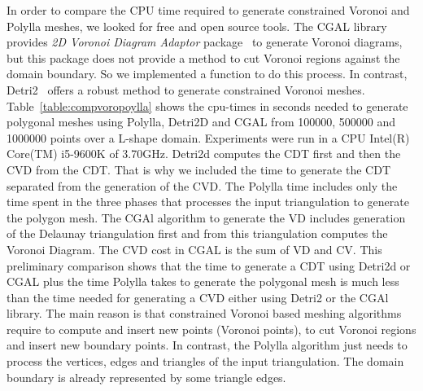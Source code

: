 \documentclass[lineno,pdflatex,sn-mathphys]{sn-jnl}%
\theoremstyle{thmstyleone}%
\theoremstyle{thmstyletwo}%
\theoremstyle{thmstylethree}%
\begin{document}
In order to compare the CPU time required to generate constrained Voronoi and Polylla meshes,  we looked for free and open source tools. The CGAL library provides  {\em  2D Voronoi Diagram Adaptor} package~\cite{cgal:k-vda2-21b} to generate Voronoi diagrams, but this package does not provide a method to cut Voronoi regions against the domain boundary. So we  implemented  a function to do this process. In contrast, Detri2~\cite{Detri2} offers a robust method to generate constrained Voronoi meshes.   Table~\ref{table:compvoropoylla} shows the cpu-times in seconds needed to generate polygonal meshes using Polylla, Detri2D and CGAL from 100000, 500000 and 1000000 points over a L-shape domain. Experiments were run in a CPU Intel(R) Core(TM) i5-9600K of 3.70GHz. Detri2d computes the CDT first and then the CVD from the CDT. That is why we included the time to generate the CDT separated from the generation of the CVD. 
The Polylla time includes only the time spent in  the three phases that processes the input triangulation to generate the polygon mesh. The CGAl algorithm to generate the VD includes generation of the Delaunay triangulation first and from this triangulation computes the Voronoi Diagram. The CVD cost in CGAL is the sum of VD and CV. This preliminary comparison shows that the time to generate a CDT using Detri2d or CGAL plus the time Polylla takes to generate the polygonal mesh is much less than the time needed for generating a CVD either using Detri2 or the CGAl library. The main reason is that constrained Voronoi based meshing algorithms require to compute and insert new points (Voronoi points), to cut Voronoi regions  and insert new boundary points. In contrast, the Polylla algorithm  just needs  to process the vertices, edges and triangles of the input triangulation.  The domain boundary is already represented by some triangle edges.

\end{document}
